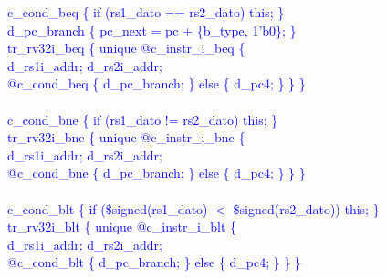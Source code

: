 \textcolor{blue}{
\indent c\_cond\_beq \{ if (rs1\_dato == rs2\_dato) this; \}\\%
\indent d\_pc\_branch \{ pc\_next = pc + \{b\_type, 1'b0\}; \}\\%
\indent tr\_rv32i\_beq \{ unique @c\_instr\_i\_beq \{ \\%
\indent \hspace{\parindent} d\_rs1i\_addr; d\_rs2i\_addr; \\%
\indent \hspace{\parindent} @c\_cond\_beq \{ d\_pc\_branch; \}  else \{ d\_pc4; \} \} \} \\%
\\
\indent c\_cond\_bne \{ if (rs1\_dato != rs2\_dato) this; \}\\%
\indent tr\_rv32i\_bne \{ unique @c\_instr\_i\_bne \{ \\%
\indent \hspace{\parindent} d\_rs1i\_addr; d\_rs2i\_addr; \\%
\indent \hspace{\parindent} @c\_cond\_bne \{ d\_pc\_branch; \}  else \{ d\_pc4; \} \} \} \\%
\\
\indent c\_cond\_blt \{ if (\$signed(rs1\_dato) $<$ \$signed(rs2\_dato)) this; \}\\%
\indent tr\_rv32i\_blt \{ unique @c\_instr\_i\_blt \{ \\%
\indent \hspace{\parindent} d\_rs1i\_addr; d\_rs2i\_addr; \\%
\indent \hspace{\parindent} @c\_cond\_blt \{ d\_pc\_branch; \}  else \{ d\_pc4; \} \} \} \\%
\\
}
